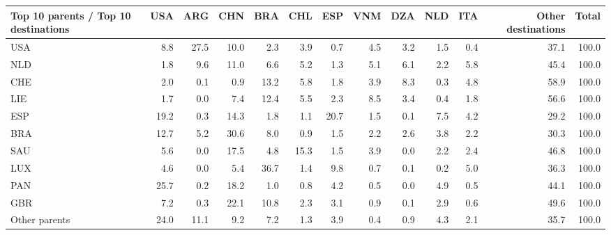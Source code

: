 \begin{tabular}{lrrrrrrrrrrrr}
\toprule
Top 10 parents / Top 10 destinations & USA & ARG & CHN & BRA & CHL & ESP & VNM & DZA & NLD & ITA & Other destinations & Total \\
\midrule
USA & 8.8 & 27.5 & 10.0 & 2.3 & 3.9 & 0.7 & 4.5 & 3.2 & 1.5 & 0.4 & 37.1 & 100.0 \\
NLD & 1.8 & 9.6 & 11.0 & 6.6 & 5.2 & 1.3 & 5.1 & 6.1 & 2.2 & 5.8 & 45.4 & 100.0 \\
CHE & 2.0 & 0.1 & 0.9 & 13.2 & 5.8 & 1.8 & 3.9 & 8.3 & 0.3 & 4.8 & 58.9 & 100.0 \\
LIE & 1.7 & 0.0 & 7.4 & 12.4 & 5.5 & 2.3 & 8.5 & 3.4 & 0.4 & 1.8 & 56.6 & 100.0 \\
ESP & 19.2 & 0.3 & 14.3 & 1.8 & 1.1 & 20.7 & 1.5 & 0.1 & 7.5 & 4.2 & 29.2 & 100.0 \\
BRA & 12.7 & 5.2 & 30.6 & 8.0 & 0.9 & 1.5 & 2.2 & 2.6 & 3.8 & 2.2 & 30.3 & 100.0 \\
SAU & 5.6 & 0.0 & 17.5 & 4.8 & 15.3 & 1.5 & 3.9 & 0.0 & 2.2 & 2.4 & 46.8 & 100.0 \\
LUX & 4.6 & 0.0 & 5.4 & 36.7 & 1.4 & 9.8 & 0.7 & 0.1 & 0.2 & 5.0 & 36.3 & 100.0 \\
PAN & 25.7 & 0.2 & 18.2 & 1.0 & 0.8 & 4.2 & 0.5 & 0.0 & 4.9 & 0.5 & 44.1 & 100.0 \\
GBR & 7.2 & 0.3 & 22.1 & 10.8 & 2.3 & 3.1 & 0.9 & 0.1 & 2.9 & 0.6 & 49.6 & 100.0 \\
Other parents & 24.0 & 11.1 & 9.2 & 7.2 & 1.3 & 3.9 & 0.4 & 0.9 & 4.3 & 2.1 & 35.7 & 100.0 \\
\bottomrule
\end{tabular}
